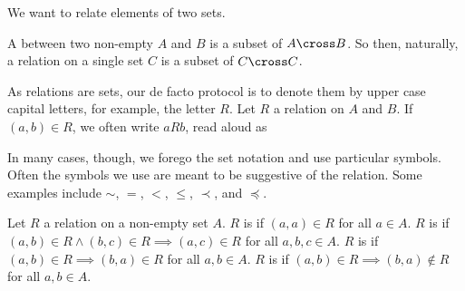 
\sbasic




\sstart


We want to relate elements of two sets.



A  between two non-empty  $A$ and $B$ is a subset of $A \cross B$.
So then, naturally, a relation on a single set $C$ is a subset of $C \cross C$.

As relations are sets, our de facto protocol is to denote them by upper case capital letters, for example, the letter $R$.
Let $R$ a relation on $A$ and $B$.
If $(a, b) \in R$, we often write $a R b$, read aloud as 

In many cases, though, we forego the set notation and use particular symbols.
Often the symbols we use are meant to be suggestive of the relation.
Some examples include $\sim$, $=$, $<$, $\leq$, $\prec$, and $\preceq$.


Let $R$ a relation on a non-empty set $A$.
$R$ is  if
$(a, a) \in R$ for all $a \in A$.
$R$ is  if
$(a, b) \in R \land (b, c) \in R \implies (a, c) \in R$
for all $a, b, c \in A$.
$R$ is  if
$(a, b) \in R \implies (b, a) \in R$
for all $a, b \in A$.
$R$ is  if
$(a, b) \in R \implies (b, a) \not\in R$ for all $a, b \in A$.

\strats
